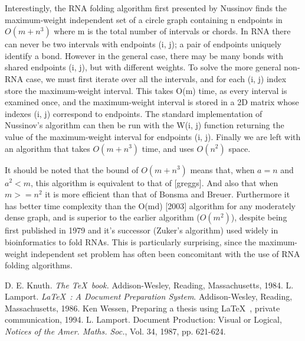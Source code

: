 \documentclass[12pt, a4paper]{article}
\begin{document}
Interestingly, the RNA folding algorithm first presented by Nussinov finds the maximum-weight independent set of a circle graph containing n endpoints in $O(m + n^3)$ where m is the total number of intervals or chords. In RNA there can never be two intervals with endpoints (i, j); a pair of endpoints uniquely identify a bond. However in the general case, there may be many bonds with shared endpoints (i, j), but with different weights. To solve the more general non-RNA case, we must first iterate over all the intervals, and for each (i, j) index store the maximum-weight interval. This takes O(m) time, as every interval is examined once, and the maximum-weight interval is stored in a 2D matrix whose indexes (i, j) correspond to endpoints. The standard implementation of Nussinov’s algorithm can then be run with the W(i, j) function returning the value of the maximum-weight interval for endpoints (i, j). Finally we are left with an algorithm that takes $O(m + n^3)$ time, and uses $O(n^2)$ space.

It should be noted that the bound of $O(m + n^3)$ means that, when $a = n$ and $a^2 < m$, this algorithm is equivalent to that of [greggs]. And also that when $m >= n^2$ it is more efficient than that of Bonsma and Breuer. Furthermore it has better time complexity than the O(md) [2003] algorithm for any moderately dense graph, and is superior to the earlier algorithm ($O(m^2)$), despite being first published in 1979 and it’s successor (Zuker’s algorithm) used widely in bioinformatics to fold RNAs. This is particularly surprising, since the maximum-weight independent set problem has often been concomitant with the use of RNA folding algorithms.

\begin{thebibliography}{9}
 D. E. Knuth. {\em The \TeX~book.}\/ Addison-Wesley,
Reading, Massachusetts, 1984.
 L. Lamport. {\em \LaTeX~: A Document Preparation
System}.\/ Addison-Wesley, Reading, Massachusetts, 1986.
 Ken Wessen, Preparing a thesis using \LaTeX~, private
communication, 1994.
 L. Lamport. Document Production: Visual
or Logical, {\em Notices of the Amer. Maths. Soc.},\/ Vol. 34,
1987, pp. 621-624.
\end{thebibliography}
\end{document}

